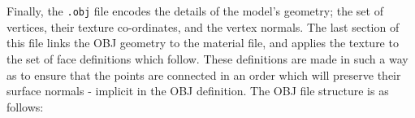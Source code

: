 \documentclass[a4paper,10pt]{article}
\begin{document}
\begin{itemize}
{\hlstd{}\hlstd{\ \ \ \ }\hlstd{\ \ }\hlnum{}\hlstd{}\hspace*{\fill}\\
\hlstd{}\hlstd{\ \ \ \ }\hlstd{\ \ }\hlstd{}\hspace*{\fill}\\
\hlstd{}\hlstd{\ \ \ \ }\hlstd{\ \ }\hlstd{}\hspace*{\fill}\\
\hlstd{}\hlstd{\ \ \ \ \ }\hlstd{}\hspace*{\fill}\\
\hlstd{}\hlstd{\ \ \ \ \ }\hlstd{}\hlstd{\ \ \ }\hlslc{{-}}\hlstd{\ \ }\hspace*{\fill}\\
\hlstd{}\hlstd{\ \ \ \ \ }\hlstd{}\hlstd{\ \ \ \ }\hlslc{{-}}\hlstd{\ \ }\hspace*{\fill}\\
\hlstd{}\hlstd{\ \ \ \ \ }\hlstd{}\hlstd{\ \ }\hlstd{}\hspace*{\fill}\\
\mbox{}
\normalfont
\normalsize


Finally, the \texttt{.obj} file encodes the details of the model's geometry; the set of vertices, their texture co-ordinates, and the vertex normals. The last section of this file links the OBJ geometry to the material file, and applies the texture to the set of face definitions which follow. These definitions are made in such a way as to ensure that the points are connected in an order which will preserve their surface normals - implicit in the OBJ definition. The OBJ file structure is as follows:

}
\end{itemize}
\end{document}
